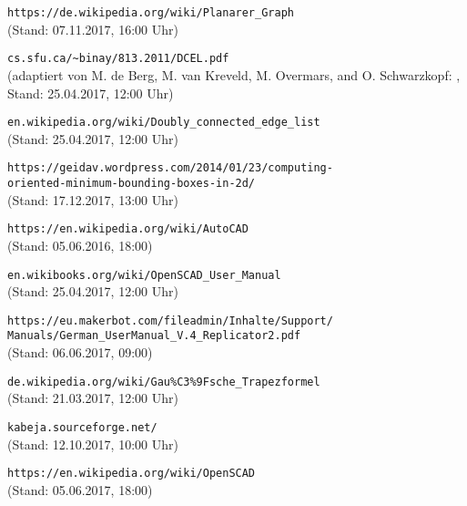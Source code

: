 \nocite{*}
\begin{thebibliography}{9}
		\verb|https://de.wikipedia.org/wiki/Planarer_Graph| \\ (Stand: 07.11.2017, 16:00 Uhr)
		
		\verb|cs.sfu.ca/~binay/813.2011/DCEL.pdf| \\ (adaptiert von M. de Berg, M. van Kreveld, M. Overmars, and O. Schwarzkopf: , Stand: 25.04.2017, 12:00 Uhr)
		
		\verb|en.wikipedia.org/wiki/Doubly_connected_edge_list| \\ (Stand: 25.04.2017, 12:00 Uhr)
		
		\verb|https://geidav.wordpress.com/2014/01/23/computing-|\\
		\tab \verb|oriented-minimum-bounding-boxes-in-2d/| \\ (Stand: 17.12.2017, 13:00 Uhr)
		
		\verb|https://en.wikipedia.org/wiki/AutoCAD| \\ (Stand: 05.06.2016, 18:00)
		
		\verb|en.wikibooks.org/wiki/OpenSCAD_User_Manual| \\ (Stand: 25.04.2017, 12:00 Uhr)
		
		\verb|https://eu.makerbot.com/fileadmin/Inhalte/Support/| \\
		\tab \verb|Manuals/German_UserManual_V.4_Replicator2.pdf| \\ (Stand: 06.06.2017, 09:00)
	
		\verb|de.wikipedia.org/wiki/Gau%C3%9Fsche_Trapezformel| \\ (Stand: 21.03.2017, 12:00 Uhr)
		
		 \verb|kabeja.sourceforge.net/| \\ (Stand: 12.10.2017, 10:00 Uhr)
		
		 
		 \verb|https://en.wikipedia.org/wiki/OpenSCAD| \\ (Stand: 05.06.2017, 18:00)
\end{thebibliography}
